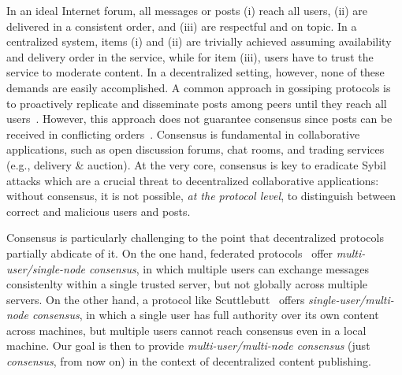 \documentclass[10pt,journal,compsoc]{IEEEtran}
\begin{document}
In an ideal Internet forum, all messages or posts
(i)   reach all users,
(ii)  are delivered in a consistent order, and
(iii) are respectful and on topic.
In a centralized system, items (i) and (ii) are trivially achieved assuming
availability and delivery order in the service, while for item (iii), users
have to trust the service to moderate content.
In a decentralized setting, however, none of these demands are easily
accomplished.
A common approach in gossiping protocols is to proactively replicate and
disseminate posts among peers until they reach all
users~\cite{p2p.survey}.
However, this approach does not guarantee consensus since posts can be received
in conflicting orders~\cite{p2p.intention}.
%
Consensus is fundamental in collaborative applications, such as open discussion
forums, chat rooms, and trading services (e.g., delivery \& auction).
At the very core, consensus is key to eradicate Sybil attacks which are a
crucial threat to decentralized collaborative applications: without
consensus, it is not possible, \emph{at the protocol level}, to distinguish
between correct and malicious users and posts.

Consensus is particularly challenging to the point that decentralized protocols
partially abdicate of it.
%
On the one hand, federated protocols~\cite{p2p.ecosystem} offer
\emph{multi-user/single-node consensus}, in which multiple users can exchange
messages consistenlty within a single trusted server, but not globally across
multiple servers.
%
On the other hand, a protocol like Scuttlebutt~\cite{p2p.scuttlebutt} offers
\emph{single-user/multi-node consensus}, in which a single user has full
authority over its own content across machines, but multiple users cannot reach
consensus even in a local machine.
%
Our goal is then to provide \emph{multi-user/multi-node consensus} (just
\emph{consensus}, from now on) in the context of decentralized content
publishing.
\end{document}
